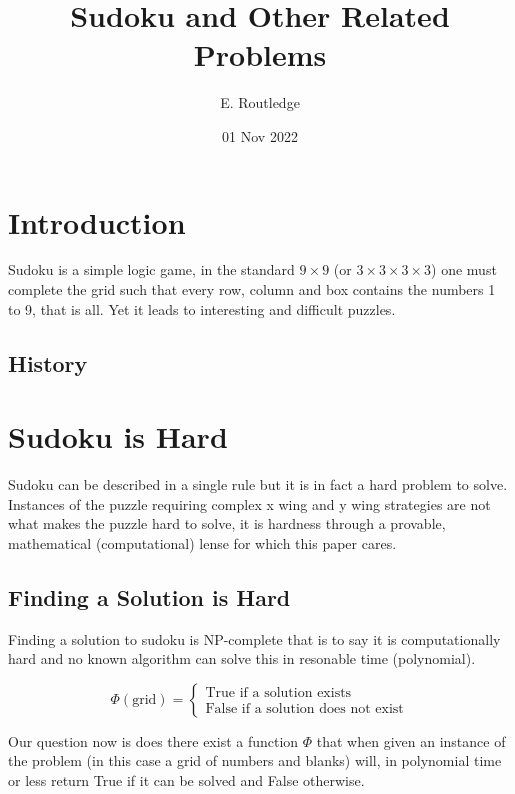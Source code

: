 \documentclass[a4paper,12pt]{article}
\author{E. Routledge}
\date{01 Nov 2022}
\title{Sudoku and Other Related Problems}
\begin{document}
\lstset{language=Python}
\maketitle

\section{Introduction}
		Sudoku is a simple logic game, in the standard $9 \times 9$ (or $3 \times 3 \times 3 \times 3$) 
		one must complete the grid such that every row, column and box contains the numbers 1 to 9, that is all. 
		Yet it leads to interesting and difficult puzzles.
	\subsection{History}
\section{Sudoku is Hard}

		Sudoku can be described in a single rule but it is in fact a hard problem to solve.
		Instances of the puzzle requiring complex x wing and y wing strategies are not what makes the puzzle hard to solve,
		it is hardness through a provable, mathematical (computational) lense for which this paper cares. 
		
	\subsection{Finding a Solution is Hard}
		
		Finding a solution to sudoku is NP-complete that is to say it is computationally hard and no known algorithm can solve this in resonable time (polynomial). 

		\begin{equation}
		        \Phi (\text{grid}) = \begin{cases}
		            \text{True if a solution exists} \\
		            \text{False if a solution does not exist}
				\end{cases}
		\end{equation}

		Our question now is does there exist a function $\Phi$ that when given an instance of the problem (in this case a grid of numbers and blanks) will, in polynomial time or less return True if it can be solved and False otherwise.
\end{document}
